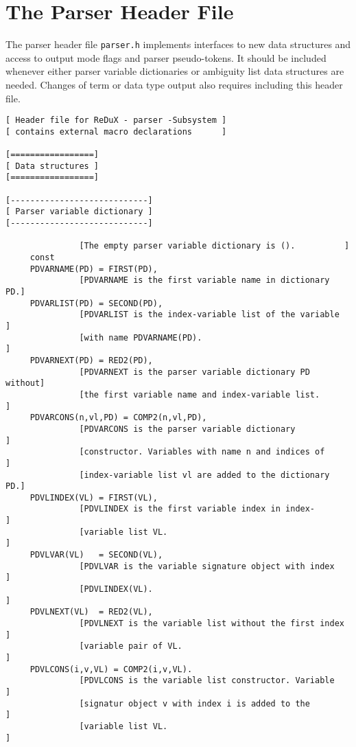 \section{The Parser Header File}

The parser header file {\tt parser.h} implements interfaces to new
data structures and access to output mode flags and parser pseudo-tokens.
It should be included whenever either parser variable dictionaries or
ambiguity list data structures are needed. Changes of term or data
type output also requires including this header file.

\begin{verbatim}
[ Header file for ReDuX - parser -Subsystem ]
[ contains external macro declarations      ]

[=================]
[ Data structures ]
[=================]

[----------------------------]
[ Parser variable dictionary ]
[----------------------------]

               [The empty parser variable dictionary is ().          ]
     const
     PDVARNAME(PD) = FIRST(PD),
               [PDVARNAME is the first variable name in dictionary PD.]
     PDVARLIST(PD) = SECOND(PD),
               [PDVARLIST is the index-variable list of the variable  ]
               [with name PDVARNAME(PD).                              ]
     PDVARNEXT(PD) = RED2(PD),
               [PDVARNEXT is the parser variable dictionary PD without]
               [the first variable name and index-variable list.      ]
     PDVARCONS(n,vl,PD) = COMP2(n,vl,PD),
               [PDVARCONS is the parser variable dictionary           ]
               [constructor. Variables with name n and indices of     ]
               [index-variable list vl are added to the dictionary PD.]
     PDVLINDEX(VL) = FIRST(VL),
               [PDVLINDEX is the first variable index in index-       ]
               [variable list VL.                                     ]
     PDVLVAR(VL)   = SECOND(VL),
               [PDVLVAR is the variable signature object with index   ]
               [PDVLINDEX(VL).                                        ]
     PDVLNEXT(VL)  = RED2(VL),
               [PDVLNEXT is the variable list without the first index ]
               [variable pair of VL.                                  ]
     PDVLCONS(i,v,VL) = COMP2(i,v,VL).
               [PDVLCONS is the variable list constructor. Variable   ]
               [signatur object v with index i is added to the        ]
               [variable list VL.                                     ]


\end{verbatim}

